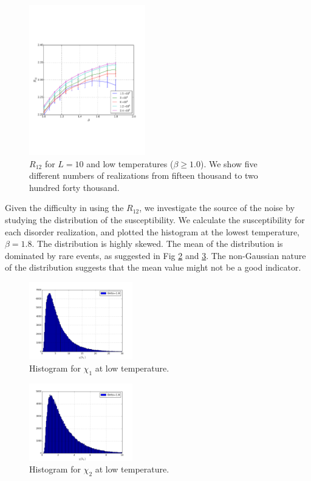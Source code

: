 \documentclass[aps,prb,twocolumn,showpacs,superscriptaddress]{revtex4}
\begin{document}
\begin{figure}[ht]
  \includegraphics[width=0.45\textwidth]{img/R12_l10_samples.pdf}
  \caption{$R_{12}$ for $L=10$ and low temperatures ($\beta \geq 1.0$). We show five different numbers of 
realizations from fifteen thousand to two hundred forty thousand.}
\label{fig:R12_l10_samples}
\end{figure}

Given the difficulty in using the $R_{12}$, we investigate the source of the noise
by studying the distribution of the susceptibility. We calculate the susceptibility
for each disorder realization, and plotted the histogram at the lowest temperature,
$\beta=1.8$. The distribution is highly skewed. The mean of the distribution is dominated by rare
events, as suggested in Fig \ref{fig:hist_chi1} and \ref{fig:hist_chi2}.
The non-Gaussian nature of the distribution suggests that the mean value might 
not be a good indicator. 

\begin{figure}[ht]
  \centering
  \includegraphics[width=0.4\textwidth]{img/chi1_18.png}
  \caption{Histogram for $\chi_1$ at low temperature.}
\label{fig:hist_chi1}
\end{figure}

\begin{figure}[ht]
  \centering
  \includegraphics[width=0.4\textwidth]{img/chi2_18.png}
  \caption{Histogram for $\chi_2$ at low temperature.}
\label{fig:hist_chi2}
\end{figure}
\end{document}
